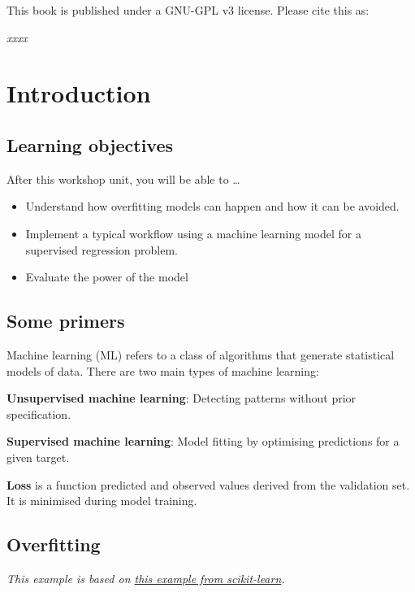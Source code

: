 \documentclass[
]{book}
\providecommand{\tightlist}{%
  \setlength{\itemsep}{0pt}\setlength{\parskip}{0pt}}
\begin{document}
This book is published under a GNU-GPL v3 license. Please cite this as:

\emph{xxxx}

\hypertarget{introduction}{%
\chapter{Introduction}\label{introduction}}

\hypertarget{learning-objectives}{%
\section{Learning objectives}\label{learning-objectives}}

After this workshop unit, you will be able to \ldots{}

\begin{itemize}
\tightlist
\item
  Understand how overfitting models can happen and how it can be avoided.
\item
  Implement a typical workflow using a machine learning model for a supervised regression problem.
\item
  Evaluate the power of the model
\end{itemize}

\hypertarget{some-primers}{%
\section{Some primers}\label{some-primers}}

Machine learning (ML) refers to a class of algorithms that generate statistical models of data. There are two main types of machine learning:

\textbf{Unsupervised machine learning}: Detecting patterns without prior specification.

\textbf{Supervised machine learning}: Model fitting by optimising predictions for a given target.

\textbf{Loss} is a function predicted and observed values derived from the validation set. It is minimised during model training.

\hypertarget{overfitting}{%
\section{Overfitting}\label{overfitting}}

\emph{This example is based on \href{https://scikit-learn.org/stable/auto_examples/model_selection/plot_underfitting_overfitting.html}{this example from scikit-learn}.}
\end{document}

